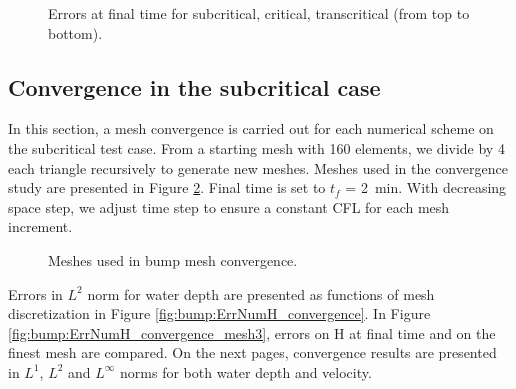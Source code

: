 \begin{figure}[H]
  \centering
  \caption{Errors at final time for subcritical, critical, transcritical (from top to bottom).}\label{fig:bump:errors}
\end{figure}

\subsection{Convergence in the subcritical case}

In this section, a mesh convergence is carried out for each numerical scheme on the subcritical test case.
From a starting mesh with 160 elements, we divide by 4 each triangle recursively to generate new meshes.
Meshes used in the convergence study are presented in Figure \ref{t2d:bump:meshes}.
Final time is set to $t_f$ = 2~min.
With decreasing space step, we adjust time step to ensure a constant CFL for each mesh increment.

\begin{figure}[H]
\begin{minipage}[t]{\textwidth}
 \centering
\end{minipage}
\begin{minipage}[t]{\textwidth}
 \centering
\end{minipage}
\begin{minipage}[t]{\textwidth}
 \centering
\end{minipage}
\begin{minipage}[t]{\textwidth}
 \centering
\end{minipage}
 \caption{Meshes used in bump mesh convergence.}
 \label{t2d:bump:meshes}
\end{figure}

Errors in $L^2$ norm for water depth
are presented as functions of mesh discretization in Figure
\ref{fig:bump:ErrNumH_convergence}. In Figure \ref{fig:bump:ErrNumH_convergence_mesh3}, errors on H
at final time and on the finest mesh are compared.
On the next pages, convergence results are presented in $L^1$, $L^2$ and $L^{\infty}$ norms for both water depth and velocity.

